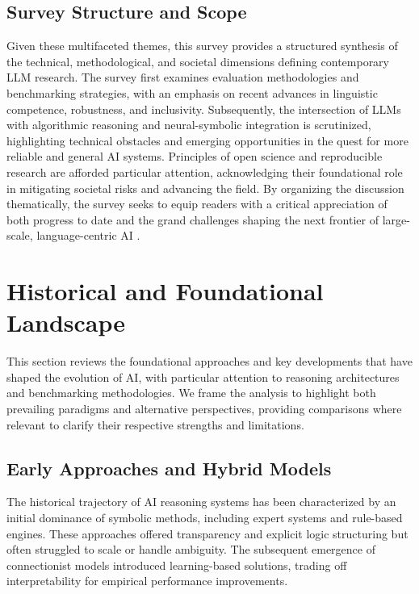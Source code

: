 \documentclass[sigconf]{acmart}
\begin{document}
\subsection{Survey Structure and Scope}

Given these multifaceted themes, this survey provides a structured synthesis of the technical, methodological, and societal dimensions defining contemporary LLM research. The survey first examines evaluation methodologies and benchmarking strategies, with an emphasis on recent advances in linguistic competence, robustness, and inclusivity. Subsequently, the intersection of LLMs with algorithmic reasoning and neural-symbolic integration is scrutinized, highlighting technical obstacles and emerging opportunities in the quest for more reliable and general AI systems. Principles of open science and reproducible research are afforded particular attention, acknowledging their foundational role in mitigating societal risks and advancing the field. By organizing the discussion thematically, the survey seeks to equip readers with a critical appreciation of both progress to date and the grand challenges shaping the next frontier of large-scale, language-centric AI \cite{ref42,ref49,ref54,ref86}.

\section{Historical and Foundational Landscape}

This section reviews the foundational approaches and key developments that have shaped the evolution of AI, with particular attention to reasoning architectures and benchmarking methodologies. We frame the analysis to highlight both prevailing paradigms and alternative perspectives, providing comparisons where relevant to clarify their respective strengths and limitations.

\subsection{Early Approaches and Hybrid Models}
The historical trajectory of AI reasoning systems has been characterized by an initial dominance of symbolic methods, including expert systems and rule-based engines. These approaches offered transparency and explicit logic structuring but often struggled to scale or handle ambiguity. The subsequent emergence of connectionist models introduced learning-based solutions, trading off interpretability for empirical performance improvements.
\end{document}
